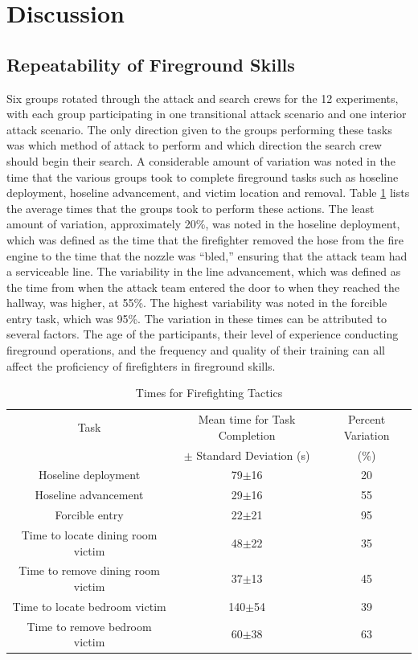 \documentclass[12pt,oneside]{article}
\begin{document}
\section{Discussion}

\subsection{Repeatability of Fireground Skills}
\label{subsec:ff_repeatability}

 Six groups rotated through the attack and search crews for the 12 experiments, with each group participating in one transitional attack scenario and one interior attack scenario. The only direction given to the groups performing these tasks was which method of attack to perform and which direction the search crew should begin their search. A considerable amount of variation was noted in the time that the various groups took to complete fireground tasks such as hoseline deployment, hoseline advancement, and victim location and removal. Table \ref{tab:ff_tasks} lists the average times that the groups took to perform these actions. The least amount of variation, approximately 20\%, was noted in the hoseline deployment, which was defined as the time that the firefighter removed the hose from the fire engine to the time that the nozzle was ``bled,'' ensuring that the attack team had a serviceable line. The variability in the line advancement, which was defined as the time from when the attack team entered the door to when they reached the hallway, was higher, at 55\%. The highest variability was noted in the forcible entry task, which was  95\%. The variation in these times can be attributed to several factors. The age of the participants, their level of experience conducting fireground operations, and the frequency and quality of their training can all affect the proficiency of firefighters in fireground skills. 

\begin{table}[!ht]
    \centering
    \caption{Times for Firefighting Tactics}
    \label{tab:ff_tasks}
    \begin{tabular}{ccc}
    \toprule[1.5pt]
 	Task&								Mean time for Task Completion  	&Percent Variation\\
 		&								$\pm$ Standard Deviation (s)	&	(\%)		\\
 	\midrule 
  	Hoseline deployment					&	79$\pm$16					&	20\\
  	Hoseline advancement				&	29$\pm$16					&	55\\
  	Forcible entry						&	22$\pm$21					&	95\\
  	Time to locate dining room victim 	&	48$\pm$22					&	35\\
  	Time to remove dining room victim 	&	37$\pm$13					&	45\\
  	Time to locate bedroom victim 		&	140$\pm$54					&	39\\
  	Time to remove bedroom victim 		&	60$\pm$38					&	63\\  	
 	\bottomrule[1.25pt] 
    \end{tabular}
\end{table}
\end{document}
